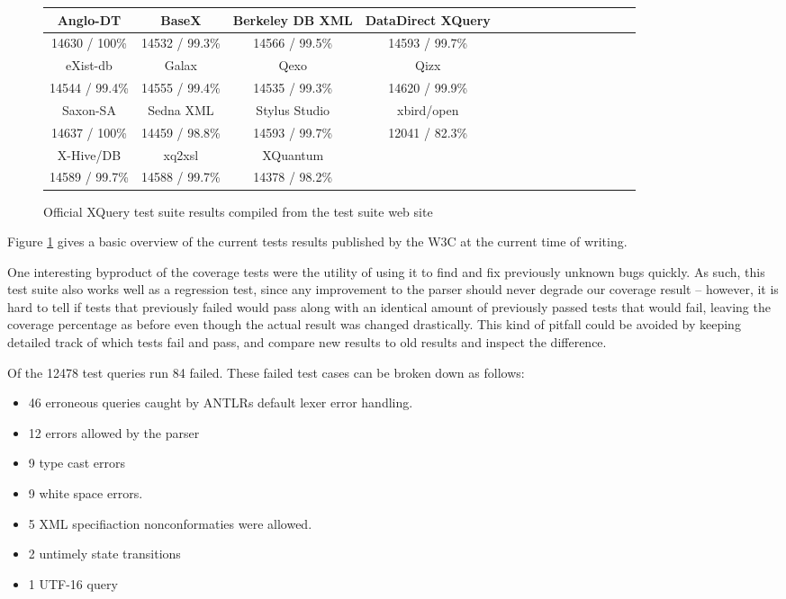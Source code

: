 \begin{figure}[h!]
  \begin{center}
    \begin{tabular}{ |c | c | c | c | c | c | c | c | c | c | c | c | c | c | c | }
      \hline
      Anglo-DT        & BaseX           & Berkeley DB XML   & DataDirect XQuery \\ \hline
      14630 / 100\%   & 14532 / 99.3\%  & 14566 / 99.5\%    & 14593 / 99.7\%  \\ \hline \hline
      eXist-db        & Galax           & Qexo              & Qizx \\ \hline            
      14544 / 99.4\%  & 14555 / 99.4\%  & 14535 / 99.3\%    & 14620 / 99.9\% \\ \hline \hline
      Saxon-SA        & Sedna XML       & Stylus Studio     & xbird/open \\ \hline
      14637 / 100\%   & 14459 / 98.8\%  & 14593 / 99.7\%    & 12041 / 82.3\% \\ \hline \hline
      X-Hive/DB       & xq2xsl          & XQuantum          & \\ \hline
      14589 / 99.7\%   & 14588 / 99.7\%  & 14378 / 98.2\%    & \\ 
    \hline
    \end{tabular}
  \end{center}
  \caption[Official XQuery test suite results]{Official XQuery test suite
  results compiled from the test suite web site\cite{w3ctestresults}} 
  \label{figure:table:w3c_test_results}
\end{figure}

Figure \ref{figure:table:w3c_test_results} gives a basic overview of the current
tests results published by the W3C at the current time of writing.

One interesting byproduct of the coverage tests were the utility of using it to
find and fix previously unknown bugs quickly. As such, this test suite also
works well as a regression test, since any improvement to the parser should
never degrade our coverage result -- however, it is hard to tell if tests that
previously failed would pass along with an identical amount of previously
passed tests that would fail, leaving the coverage percentage as before even
though the actual result was changed drastically. This kind of pitfall could be
avoided by keeping detailed track of which tests fail and pass, and compare new
results to old results and inspect the difference.

Of the 12478 test queries run 84 failed. These failed test cases can be broken down as follows:
\begin{itemize}
\item 46 erroneous queries caught by ANTLRs default lexer error handling.
\item 12 errors allowed by the parser
\item 9 type cast errors
\item 9 white space errors.
\item 5 XML specifiaction nonconformaties were allowed.
\item 2 untimely state transitions
\item 1 UTF-16 query
\end{itemize}

